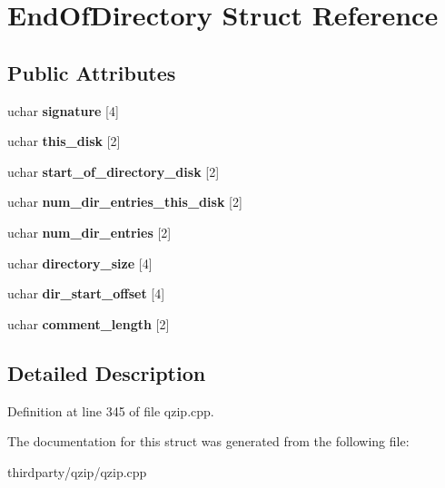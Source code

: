 \hypertarget{struct_end_of_directory}{}\section{End\+Of\+Directory Struct Reference}
\label{struct_end_of_directory}
\subsection*{Public Attributes}
\begin{DoxyCompactItemize}
\item 
\mbox{\label{struct_end_of_directory_a3691e58b18026309dc85fc37ac7697a9}} 
uchar {\bfseries signature} \mbox{[}4\mbox{]}
\item 
\mbox{\label{struct_end_of_directory_a99b057c9cdfafe4053a7919f9f0b9fc7}} 
uchar {\bfseries this\+\_\+disk} \mbox{[}2\mbox{]}
\item 
\mbox{\label{struct_end_of_directory_a0f7cf292c133520c18cf3f6567d2debe}} 
uchar {\bfseries start\+\_\+of\+\_\+directory\+\_\+disk} \mbox{[}2\mbox{]}
\item 
\mbox{\label{struct_end_of_directory_af3b86fad3386ee5f77fd17fef6f98d7a}} 
uchar {\bfseries num\+\_\+dir\+\_\+entries\+\_\+this\+\_\+disk} \mbox{[}2\mbox{]}
\item 
\mbox{\label{struct_end_of_directory_a122130b19f2528a6adedd64947f4a30b}} 
uchar {\bfseries num\+\_\+dir\+\_\+entries} \mbox{[}2\mbox{]}
\item 
\mbox{\label{struct_end_of_directory_a39513f5746fc29673a380641db3a4d3f}} 
uchar {\bfseries directory\+\_\+size} \mbox{[}4\mbox{]}
\item 
\mbox{\label{struct_end_of_directory_ad53681a18836350aab1adf8c7d9558c8}} 
uchar {\bfseries dir\+\_\+start\+\_\+offset} \mbox{[}4\mbox{]}
\item 
\mbox{\label{struct_end_of_directory_aea28dffb19fc41b6959816852d8a59e1}} 
uchar {\bfseries comment\+\_\+length} \mbox{[}2\mbox{]}
\end{DoxyCompactItemize}


\subsection{Detailed Description}


Definition at line 345 of file qzip.\+cpp.



The documentation for this struct was generated from the following file\+:\begin{DoxyCompactItemize}
\item 
thirdparty/qzip/qzip.\+cpp\end{DoxyCompactItemize}
